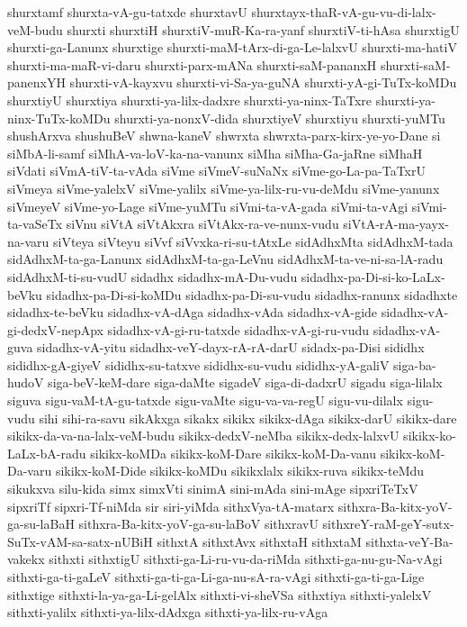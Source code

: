 {shurxtamf
shurxta-vA-gu-tatxde
shurxtavU
shurxtayx-thaR-vA-gu-vu-di-lalx-veM-budu
shurxti
shurxtiH
shurxtiV-muR-Ka-ra-yanf
shurxtiV-ti-hAsa
shurxtigU
shurxti-ga-Lanunx
shurxtige
shurxti-maM-tArx-di-ga-Le-lalxvU
shurxti-ma-hatiV
shurxti-ma-maR-vi-daru
shurxti-parx-mANa
shurxti-saM-pananxH
shurxti-saM-panenxYH
shurxti-vA-kayxvu
shurxti-vi-Sa-ya-guNA
shurxti-yA-gi-TuTx-koMDu
shurxtiyU
shurxtiya
shurxti-ya-lilx-dadxre
shurxti-ya-ninx-TaTxre
shurxti-ya-ninx-TuTx-koMDu
shurxti-ya-nonxV-dida
shurxtiyeV
shurxtiyu
shurxti-yuMTu
shushArxva
shushuBeV
shwna-kaneV
shwrxta
shwrxta-parx-kirx-ye-yo-Dane
si
siMbA-li-samf
siMhA-va-loV-ka-na-vanunx
siMha
siMha-Ga-jaRne
siMhaH
siVdati
siVmA-tiV-ta-vAda
siVme
siVmeV-suNaNx
siVme-go-La-pa-TaTxrU
siVmeya
siVme-yalelxV
siVme-yalilx
siVme-ya-lilx-ru-vu-deMdu
siVme-yanunx
siVmeyeV
siVme-yo-Lage
siVme-yuMTu
siVmi-ta-vA-gada
siVmi-ta-vAgi
siVmi-ta-vaSeTx
siVnu
siVtA
siVtAkxra
siVtAkx-ra-ve-nunx-vudu
siVtA-rA-ma-yayx-na-varu
siVteya
siVteyu
siVvf
siVvxka-ri-su-tAtxLe
sidAdhxMta
sidAdhxM-tada
sidAdhxM-ta-ga-Lanunx
sidAdhxM-ta-ga-LeVnu
sidAdhxM-ta-ve-ni-sa-lA-radu
sidAdhxM-ti-su-vudU
sidadhx
sidadhx-mA-Du-vudu
sidadhx-pa-Di-si-ko-LaLx-beVku
sidadhx-pa-Di-si-koMDu
sidadhx-pa-Di-su-vudu
sidadhx-ranunx
sidadhxte
sidadhx-te-beVku
sidadhx-vA-dAga
sidadhx-vAda
sidadhx-vA-gide
sidadhx-vA-gi-dedxV-nepApx
sidadhx-vA-gi-ru-tatxde
sidadhx-vA-gi-ru-vudu
sidadhx-vA-guva
sidadhx-vA-yitu
sidadhx-veY-dayx-rA-rA-darU
sidadx-pa-Disi
sididhx
sididhx-gA-giyeV
sididhx-su-tatxve
sididhx-su-vudu
sididhx-yA-galiV
siga-ba-hudoV
siga-beV-keM-dare
siga-daMte
sigadeV
siga-di-dadxrU
sigadu
siga-lilalx
siguva
sigu-vaM-tA-gu-tatxde
sigu-vaMte
sigu-va-va-regU
sigu-vu-dilalx
sigu-vudu
sihi
sihi-ra-savu
sikAkxga
sikakx
sikikx
sikikx-dAga
sikikx-darU
sikikx-dare
sikikx-da-va-na-lalx-veM-budu
sikikx-dedxV-neMba
sikikx-dedx-lalxvU
sikikx-ko-LaLx-bA-radu
sikikx-koMDa
sikikx-koM-Dare
sikikx-koM-Da-vanu
sikikx-koM-Da-varu
sikikx-koM-Dide
sikikx-koMDu
sikikxlalx
sikikx-ruva
sikikx-teMdu
sikukxva
silu-kida
simx
simxVti
sinimA
sini-mAda
sini-mAge
sipxriTeTxV
sipxriTf
sipxri-Tf-niMda
sir
siri-yiMda
sithxVya-tA-matarx
sithxra-Ba-kitx-yoV-ga-su-laBaH
sithxra-Ba-kitx-yoV-ga-su-laBoV
sithxravU
sithxreY-raM-geY-sutx-SuTx-vAM-sa-satx-nUBiH
sithxtA
sithxtAvx
sithxtaH
sithxtaM
sithxta-veY-Ba-vakekx
sithxti
sithxtigU
sithxti-ga-Li-ru-vu-da-riMda
sithxti-ga-nu-gu-Na-vAgi
sithxti-ga-ti-gaLeV
sithxti-ga-ti-ga-Li-ga-nu-sA-ra-vAgi
sithxti-ga-ti-ga-Lige
sithxtige
sithxti-la-ya-ga-Li-gelAlx
sithxti-vi-sheVSa
sithxtiya
sithxti-yalelxV
sithxti-yalilx
sithxti-ya-lilx-dAdxga
sithxti-ya-lilx-ru-vAga
}
